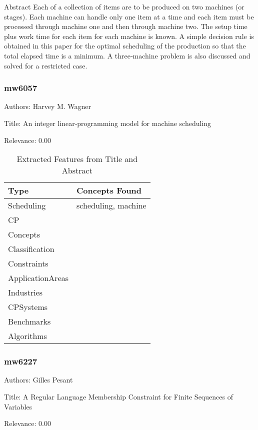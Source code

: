  Abstract  Each of a collection of items are to be produced on two machines (or stages). Each machine can handle only one item at a time and each item must be processed through machine one and then through machine two. The setup time plus work time for each item for each machine is known. A simple decision rule is obtained in this paper for the optimal scheduling of the production so that the total elapsed time is a minimum. A three‐machine problem is also discussed and solved for a restricted case. 

\subsubsection{mw6057}
\label{mw:mw6057}

Authors: Harvey M. Wagner

Title: An integer linear‐programming model for machine scheduling

Relevance:  0.00

{\scriptsize
\begin{longtable}{p{2cm}p{20cm}}
\caption{Extracted Features from Title and Abstract}\\ \toprule
Type & Concepts Found\\ \midrule
\endhead
\bottomrule
\endfoot
Scheduling & scheduling, machine\\ 
CP & \\ 
Concepts & \\ 
Classification & \\ 
Constraints & \\ 
ApplicationAreas & \\ 
Industries & \\ 
CPSystems & \\ 
Benchmarks & \\ 
Algorithms & \\ 
\end{longtable}
}



\subsubsection{mw6227}
\label{mw:mw6227}

Authors: Gilles Pesant

Title: A Regular Language Membership Constraint for Finite Sequences of Variables

Relevance:  0.00

